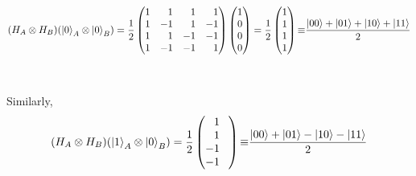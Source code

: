 \documentclass[a4paper,12pt]{article}
\begin{document}
\begin{enumerate}[label=(\alph*)]
        \[(H_{A} \otimes H_{B})(\ket{0}_{A} \otimes \ket{0}_{B}) = \frac{1}{2}\begin{pmatrix}
            1 & \phantom{-}1 & \phantom{-}1 & \phantom{-}1 \\
            1 & -1 & \phantom{-}1 & -1 \\
            1 & \phantom{-}1 & -1 & -1 \\
            1 & -1 & -1 & \phantom{-}1\\
        \end{pmatrix}\begin{pmatrix}
            1 \\
            0 \\
            0 \\
            0 \\
        \end{pmatrix} = \frac{1}{2} \begin{pmatrix}
            1 \\
            1 \\
            1 \\
            1 \\
        \end{pmatrix} {\displaystyle \equiv }	\frac{\ket{00} + \ket{01} + \ket{10} + \ket{11}}{2}\] \\~\\
        Similarly, \[(H_{A} \otimes H_{B})(\ket{1}_{A} \otimes \ket{0}_{B}) = \frac{1}{2}\begin{pmatrix}
            \phantom{-} 1 \phantom{-} \\
            \phantom{-} 1 \phantom{-} \\
            -1\phantom{-} \\
            -1\phantom{-} \\
        \end{pmatrix} {\displaystyle \equiv } \frac{\ket{00} + \ket{01} - \ket{10} - \ket{11}}{2}\]


\end{enumerate}
\end{document}
